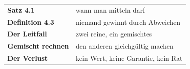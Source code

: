 \begin{merksatz}
\begin{center}
\renewcommand{\arraystretch}{1.5}
\begin{tabular}{@{}P{3.0cm}P{5.6cm}@{}}
\toprule
\textbf{Satz 4.1} & wann man mitteln darf\\
\textbf{Definition 4.3} & niemand gewinnt durch Abweichen\\
\textbf{Der Leitfall} & zwei reine, ein gemischtes\\
\textbf{Gemischt rechnen} & den anderen gleichgültig machen\\
\textbf{Der Verlust} & kein Wert, keine Garantie, kein Rat\\
\bottomrule
\end{tabular}
\end{center}

\begin{center}
\begin{minipage}{0.88\textwidth}
\end{minipage}
\end{center}
\end{merksatz}
